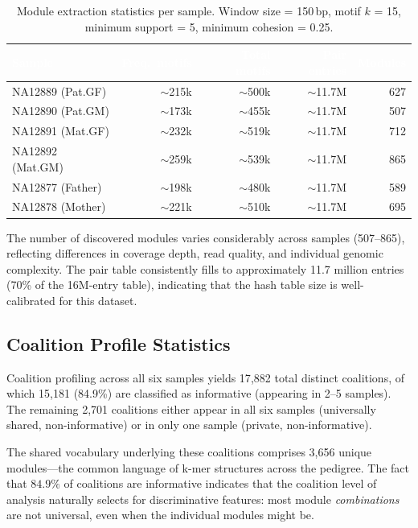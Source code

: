 \documentclass{../yalumba}
\begin{document}
\begin{table}[htbp]
\centering
\tablestyle
\caption{Module extraction statistics per sample.  Window size = 150\,bp,
motif $k$ = 15, minimum support = 5, minimum cohesion = 0.25.}
\label{tab:module-stats}
\begin{tabular}{lrrrr}
\toprule
\rowcolor{table-header}
\textcolor{white}{\textbf{Sample}} &
\textcolor{white}{\textbf{Freq.\ motifs}} &
\textcolor{white}{\textbf{Total motifs}} &
\textcolor{white}{\textbf{Pair entries}} &
\textcolor{white}{\textbf{Modules}} \\
\midrule
NA12889 (Pat.GF)  & $\sim$215k & $\sim$500k & $\sim$11.7M & 627 \\
NA12890 (Pat.GM)  & $\sim$173k & $\sim$455k & $\sim$11.7M & 507 \\
NA12891 (Mat.GF)  & $\sim$232k & $\sim$519k & $\sim$11.7M & 712 \\
NA12892 (Mat.GM)  & $\sim$259k & $\sim$539k & $\sim$11.7M & 865 \\
NA12877 (Father)  & $\sim$198k & $\sim$480k & $\sim$11.7M & 589 \\
NA12878 (Mother)  & $\sim$221k & $\sim$510k & $\sim$11.7M & 695 \\
\bottomrule
\end{tabular}
\end{table}

The number of discovered modules varies considerably across samples
(507--865), reflecting differences in coverage depth, read quality, and
individual genomic complexity.  The pair table consistently fills to
approximately 11.7 million entries (70\% of the 16M-entry table), indicating
that the hash table size is well-calibrated for this dataset.

\subsection{Coalition Profile Statistics}
\label{sec:results-profiles}

Coalition profiling across all six samples yields 17{,}882 total distinct
coalitions, of which 15{,}181 (84.9\%) are classified as informative (appearing
in 2--5 samples).  The remaining 2{,}701 coalitions either appear in all six
samples (universally shared, non-informative) or in only one sample (private,
non-informative).

The shared vocabulary underlying these coalitions comprises 3{,}656 unique
modules---the common language of k-mer structures across the pedigree.  The
fact that $84.9\%$ of coalitions are informative indicates that the coalition
level of analysis naturally selects for discriminative features: most
module \emph{combinations} are not universal, even when the individual modules
might be.
\end{document}

